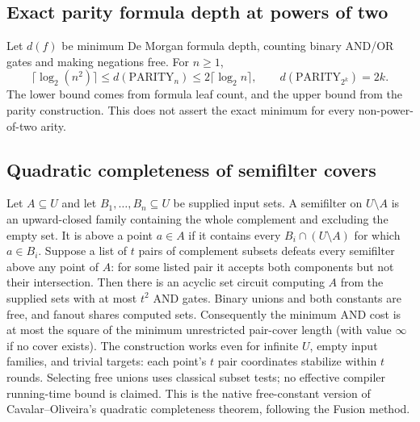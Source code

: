 \begin{result}
\subsection{Exact parity formula depth at powers of two}
Let $d(f)$ be minimum De Morgan formula depth, counting binary AND/OR gates
and making negations free. For $n\ge1$,
\[
\lceil\log_2(n^2)\rceil\le d(\mathrm{PARITY}_n)
 \le2\lceil\log_2 n\rceil,
\qquad d(\mathrm{PARITY}_{2^k})=2k.
\]
The lower bound comes from formula leaf count, and the upper bound from
the parity construction. This does not assert the exact minimum for every
non-power-of-two arity.\citep{Khrapchenko1971b,Yablonskii1954,Jukna2012}
\end{result}

\begin{result}
\subsection{Quadratic completeness of semifilter covers}
Let $A\subseteq U$ and let $B_1,\ldots,B_n\subseteq U$ be supplied input sets.
A semifilter on $U\setminus A$ is an upward-closed family containing the whole
complement and excluding the empty set. It is above a point $a\in A$ if it
contains every $B_i\cap(U\setminus A)$ for which $a\in B_i$.
Suppose a list of $t$ pairs of complement subsets defeats every semifilter above any point of $A$:
for some listed pair it accepts both components but not their intersection.
Then there is an acyclic set circuit computing $A$ from the supplied sets with
at most $t^2$ AND gates. Binary unions and both constants are free, and fanout
shares computed sets. Consequently the minimum AND cost is at most the square
of the minimum unrestricted pair-cover length (with value $\infty$ if no cover exists).
The construction works even for infinite $U$, empty input families, and trivial
targets: each point's $t$ pair coordinates stabilize within $t$ rounds. Selecting
free unions uses classical subset tests; no effective compiler running-time bound
is claimed. This is the native free-constant version of Cavalar--Oliveira's
quadratic completeness theorem, following the Fusion method.
\citep{CavalarOliveira2025}
\end{result}

